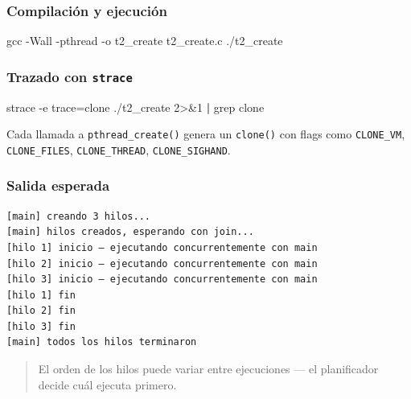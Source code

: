 \documentclass[
  spanish,
]{article}
\newenvironment{Shaded}{}{}
\newcommand{\AttributeTok}[1]{\textcolor[rgb]{0.49,0.56,0.16}{#1}}
\newcommand{\DecValTok}[1]{\textcolor[rgb]{0.25,0.63,0.44}{#1}}
\newcommand{\ExtensionTok}[1]{#1}
\newcommand{\FunctionTok}[1]{\textcolor[rgb]{0.02,0.16,0.49}{#1}}
\newcommand{\KeywordTok}[1]{\textcolor[rgb]{0.00,0.44,0.13}{\textbf{#1}}}
\newcommand{\NormalTok}[1]{#1}
\newcommand{\OperatorTok}[1]{\textcolor[rgb]{0.40,0.40,0.40}{#1}}
\begin{document}
\subsubsection{Compilación y
ejecución}\label{compilaciuxf3n-y-ejecuciuxf3n-1}

\begin{Shaded}
\begin{Highlighting}[]
\FunctionTok{gcc} \AttributeTok{{-}Wall} \AttributeTok{{-}pthread} \AttributeTok{{-}o}\NormalTok{ t2\_create t2\_create.c}
\ExtensionTok{./t2\_create}
\end{Highlighting}
\end{Shaded}

\subsubsection{\texorpdfstring{Trazado con
\texttt{strace}}{Trazado con strace}}\label{trazado-con-strace}

\begin{Shaded}
\begin{Highlighting}[]
\ExtensionTok{strace} \AttributeTok{{-}e}\NormalTok{ trace=clone ./t2\_create }\DecValTok{2}\OperatorTok{\textgreater{}\&}\DecValTok{1} \KeywordTok{|} \FunctionTok{grep}\NormalTok{ clone}
\end{Highlighting}
\end{Shaded}

Cada llamada a \texttt{pthread\_create()} genera un \texttt{clone()} con
flags como \texttt{CLONE\_VM}, \texttt{CLONE\_FILES},
\texttt{CLONE\_THREAD}, \texttt{CLONE\_SIGHAND}.

\subsubsection{Salida esperada}\label{salida-esperada-1}

\begin{verbatim}
[main] creando 3 hilos...
[main] hilos creados, esperando con join...
[hilo 1] inicio — ejecutando concurrentemente con main
[hilo 2] inicio — ejecutando concurrentemente con main
[hilo 3] inicio — ejecutando concurrentemente con main
[hilo 1] fin
[hilo 2] fin
[hilo 3] fin
[main] todos los hilos terminaron
\end{verbatim}

\begin{quote}
El orden de los hilos puede variar entre ejecuciones --- el planificador
decide cuál ejecuta primero.
\end{quote}
\end{document}

